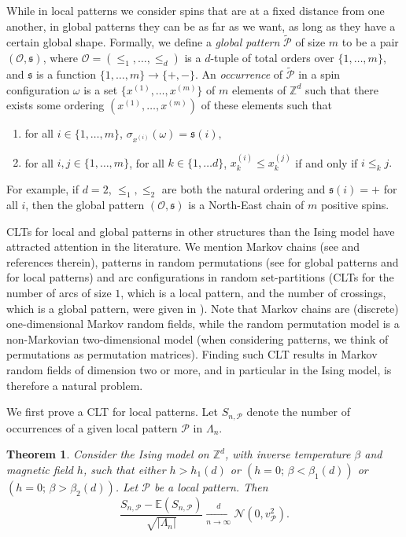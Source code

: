 \documentclass{amsart}
\newcommand{\field}[1]{\mathbb{#1}}
\newcommand{\Z}{\field{Z}}
\numberwithin{equation}{section}
\newtheorem{theorem}{Theorem}[section]
\theoremstyle{remark}
\begin{document}
While in local patterns we consider spins that are at a fixed distance from one another, in global patterns they can be as far as we want, as long as they have a certain global shape. Formally, we define a \emph{global pattern} $\tilde{\mathcal{P}}$ of size $m$ to be a pair $(\mathcal{O}, \mathfrak{s})$, where $\mathcal{O}=(\leq_1, \dots , \leq_d)$ is a $d$-tuple of total orders over $\{1, \dots , m\}$, and $\mathfrak{s}$ is a function $\{1, \dots , m\} \longrightarrow \{+,-\}.$
An \emph{occurrence} of $\tilde{\mathcal{P}}$ in a spin configuration $\omega$ is a set $\{x^{(1)}, \dots ,x^{(m)}\}$ of $m$ elements of $\Z^d$ such that there exists some ordering $(x^{(1)}, \dots , x^{(m)})$ of these elements such that
\begin{enumerate}
\item for all $i \in \{1, \dots , m\}$, $\sigma_{x^{(i)}}(\omega) = \mathfrak{s}(i),$
\item for all $i,j \in \{1, \dots , m\}$, for all $k \in \{1, \dots d \}$, $x^{(i)}_k \leq x^{(j)}_k$ if and only if $i \leq_k j.$
\end{enumerate}
For example, if $d=2$, $\leq_1, \leq_2$ are both the natural ordering and $\mathfrak{s}(i) =+$ for all $i$,
then the global pattern $(\mathcal{O}, \mathfrak{s})$ is a North-East chain of $m$ positive spins.

CLTs for local and global patterns in other structures than the Ising model have attracted attention in the literature. We mention Markov chains (see \cite{Regnier_Spankowski:CLTPattern,FlajoletValleePatterns,Valentin} and references therein),
patterns in random permutations (see \cite{BonaMonotonePatterns,JansonNakamuraZeilberger} for global patterns and
 \cite{GoldsteinConsecutifs,BonaMonotonePatterns,ElizaldeEtAlConsecutifs} for local patterns)
and arc configurations in random set-partitions (CLTs for the number of arcs of size $1$, which is a local pattern,
and the number of crossings, which is a global pattern, were given in \cite{CLT_SetPartitionsStatistics}).
Note that Markov chains are (discrete) one-dimensional Markov random fields,
while the random permutation model is a non-Markovian two-dimensional model
(when considering patterns, we think of permutations as permutation matrices).
Finding such CLT results in Markov random fields of dimension two or more, and in particular in the Ising model,
is therefore a natural problem.
\bigskip

We first prove a CLT for local patterns.
Let $S_{n,\mathcal{P}}$ denote 
the number of occurrences of a given local pattern $\mathcal{P}$ in $\Lambda_n$.
\begin{theorem}
\label{th:cltpower}
Consider the Ising model on $\Z^d$, with inverse temperature $\beta$ and magnetic field $h$, such that either $h > h_1(d)$ or $(h=0;\, \beta < \beta_1(d))$ or $(h=0;\, \beta > \beta_2(d))$. Let $\mathcal{P}$ be a local pattern. Then
$$\frac{S_{n,\mathcal{P}} - \mathbb{E}(S_{n,\mathcal{P}}) }{\sqrt{|\Lambda_n|}} \xrightarrow[n\to\infty]{d} \mathcal{N}(0, v_{\mathcal{P}}^2).$$
\end{theorem}
\end{document}
